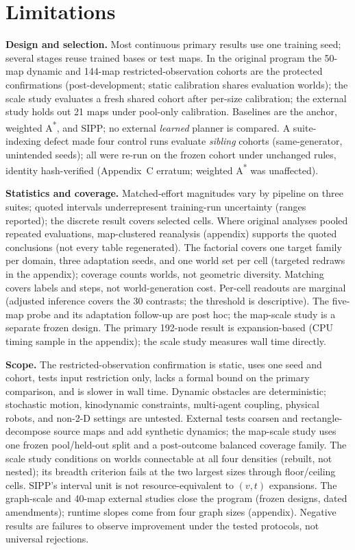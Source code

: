\documentclass[letterpaper]{article} %
\begin{document}
\section{Limitations}

 \textbf{Design and selection.} Most continuous primary results use one training seed; several stages reuse trained bases or test maps. In the original program the 50-map dynamic and 144-map restricted-observation cohorts are the protected confirmations (post-development; static calibration shares evaluation worlds); the scale study evaluates a fresh shared cohort after per-size calibration; the external study holds out 21 maps under pool-only calibration. Baselines are the anchor, weighted A\textsuperscript{*}, and SIPP; no external \emph{learned} planner is compared. A suite-indexing defect made four control runs evaluate \emph{sibling} cohorts (same-generator, unintended seeds); all were re-run on the frozen cohort under unchanged rules, identity hash-verified (Appendix~C erratum; weighted A\textsuperscript{*} was unaffected).

 \textbf{Statistics and coverage.} Matched-effort magnitudes vary by pipeline on three suites; quoted intervals underrepresent training-run uncertainty (ranges reported); the discrete result covers selected cells. Where original analyses pooled repeated evaluations, map-clustered reanalysis (appendix) supports the quoted conclusions (not every table regenerated). The factorial covers one target family per domain, three adaptation seeds, and one world set per cell (targeted redraws in the appendix); coverage counts worlds, not geometric diversity. Matching covers labels and steps, not world-generation cost. Per-cell readouts are marginal (adjusted inference covers the 30 contrasts; the threshold is descriptive). The five-map probe and its adaptation follow-up are post hoc; the map-scale study is a separate frozen design. The primary 192-node result is expansion-based (CPU timing sample in the appendix); the scale study measures wall time directly.

 \textbf{Scope.} The restricted-observation confirmation is static, uses one seed and cohort, tests input restriction only, lacks a formal bound on the primary comparison, and is slower in wall time. Dynamic obstacles are deterministic; stochastic motion, kinodynamic constraints, multi-agent coupling, physical robots, and non-2-D settings are untested. External tests coarsen and rectangle-decompose source maps and add synthetic dynamics; the map-scale study uses one frozen pool/held-out split and a post-outcome balanced coverage family. The scale study conditions on worlds connectable at all four densities (rebuilt, not nested); its breadth criterion fails at the two largest sizes through floor/ceiling cells. SIPP's interval unit is not resource-equivalent to $(v,t)$ expansions. The graph-scale and 40-map external studies close the program (frozen designs, dated amendments); runtime slopes come from four graph sizes (appendix). Negative results are failures to observe improvement under the tested protocols, not universal rejections.
\end{document}
